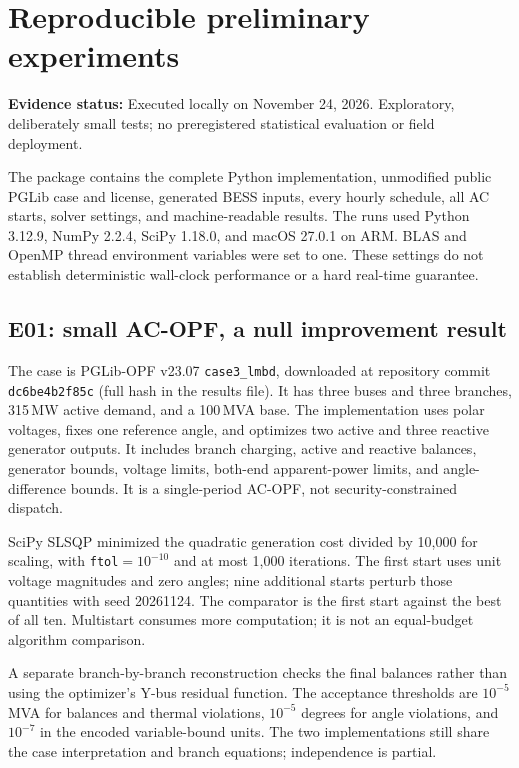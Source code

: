 \documentclass[11pt,letterpaper]{article}
\newcommand{\status}[1]{\textbf{Evidence status:} #1}
\begin{document}
\section{Reproducible preliminary experiments}
\label{sec:results}
\status{Executed locally on November 24, 2026. Exploratory, deliberately small tests; no preregistered statistical evaluation or field deployment.}

The package contains the complete Python implementation, unmodified public PGLib case and license, generated BESS inputs, every hourly schedule, all AC starts, solver settings, and machine-readable results. The runs used Python 3.12.9, NumPy 2.2.4, SciPy 1.18.0, and macOS 27.0.1 on ARM. BLAS and OpenMP thread environment variables were set to one. These settings do not establish deterministic wall-clock performance or a hard real-time guarantee.

\subsection{E01: small AC-OPF, a null improvement result}
The case is PGLib-OPF v23.07 \texttt{case3\_lmbd}, downloaded at repository commit
\texttt{dc6be4b2f85c} (full hash in the results file). It has three buses and three branches, 315\,MW active demand, and a 100\,MVA base. The implementation uses polar voltages, fixes one reference angle, and optimizes two active and three reactive generator outputs. It includes branch charging, active and reactive balances, generator bounds, voltage limits, both-end apparent-power limits, and angle-difference bounds. It is a single-period AC-OPF, not security-constrained dispatch.

SciPy SLSQP minimized the quadratic generation cost divided by 10,000 for scaling, with \texttt{ftol}$=10^{-10}$ and at most 1,000 iterations. The first start uses unit voltage magnitudes and zero angles; nine additional starts perturb those quantities with seed 20261124. The comparator is the first start against the best of all ten. Multistart consumes more computation; it is not an equal-budget algorithm comparison.

A separate branch-by-branch reconstruction checks the final balances rather than using the optimizer's Y-bus residual function. The acceptance thresholds are $10^{-5}$\,MVA for balances and thermal violations, $10^{-5}$ degrees for angle violations, and $10^{-7}$ in the encoded variable-bound units. The two implementations still share the case interpretation and branch equations; independence is partial.
\end{document}
